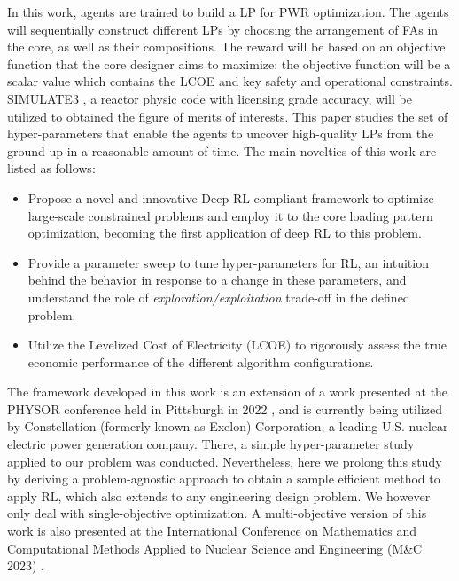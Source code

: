 \documentclass[a4paper]{article}
\begin{document}
In this work, agents are trained to build a LP for PWR optimization. The agents will sequentially construct different LPs by choosing the arrangement of FAs in the core, as well as their compositions. The reward will be based on an objective function that the core designer aims to maximize: the objective function will be a scalar value which contains the LCOE and key safety and operational constraints. SIMULATE3 \cite{rempe1989simulate}, a reactor physic code with licensing grade accuracy, will be utilized to obtained the figure of merits of interests. This paper studies the set of hyper-parameters that enable the agents to uncover high-quality LPs from the ground up in a reasonable amount of time. The main novelties of this work are listed as follows:
\begin{itemize}
    \item 
    Propose a novel and innovative Deep RL-compliant framework to optimize large-scale constrained problems and employ it to the core loading pattern optimization, becoming the first application of deep RL to this problem.
    \item
    Provide a parameter sweep to tune hyper-parameters for RL, an intuition behind the behavior in response to a change in these parameters, and understand the role of \textit{exploration/exploitation} trade-off in the defined problem.
    \item 
    Utilize the Levelized Cost of Electricity (LCOE) to rigorously assess the true economic performance of the different algorithm configurations. 
\end{itemize}

The framework developed in this work is an extension of a work presented at the PHYSOR conference held in Pittsburgh in 2022 \cite{seurin2022pwr}, and is currently being utilized by Constellation (formerly known as Exelon) Corporation, 
a leading U.S. nuclear electric power generation company. There, a simple hyper-parameter study applied to our problem was conducted. Nevertheless, here we prolong this study by deriving a problem-agnostic approach to obtain a sample efficient method to apply RL, which also extends to any engineering design problem. We however only deal with single-objective optimization. A multi-objective version of this work is also presented at the International Conference on Mathematics and Computational Methods Applied to Nuclear Science and Engineering (M\&C 2023) \cite{seurin2023pareto}. 
\end{document}
